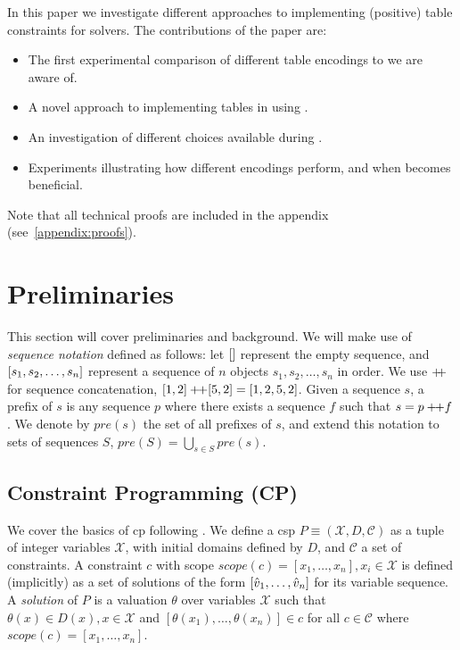 \documentclass[a4paper,UKenglish,cleveref,autoref,thm-restate]{lipics-v2021}
\begin{document}
In this paper we investigate different approaches to implementing (positive) table constraints for \milp solvers. The contributions of the paper are:
\begin{itemize}
    \item The first experimental comparison of different table encodings to \milp we are aware of.
    \item A novel approach to implementing tables in \milp using .
    \item An investigation of different choices available during 
    . 
    \item Experiments illustrating how different encodings perform, and when  becomes beneficial.
\end{itemize}

Note that all technical proofs are included in the appendix (see~\cref{appendix:proofs}).


\section{Preliminaries}
\label{sec:prelim}

This section will cover preliminaries and background.
We will make use of \emph{sequence notation} defined as follows: let $[]$ represent the empty sequence, and $[s_1, s_2, \ldots, s_n]$ represent a sequence of $n$ objects $s_1, s_2, \ldots, s_n$ in order.
We use $+\!\!+$ for sequence concatenation, \eg $[1,2] +\!\!+ [5,2] = [1,2,5,2]$.
Given a sequence $s$, a prefix of $s$ is any sequence $p$ where there exists a sequence $f$ such that $s = p +\!\!+ f$.
We denote by $pre(s)$ the set of all prefixes of $s$, and extend this notation to sets of sequences $S$, $pre(S) = \bigcup_{s \in S} pre(s)$. 

\subsection{Constraint Programming (CP)}

We cover the basics of \gls{cp} following .
We define a \gls{csp} $P \equiv (\mathcal{X},D,\mathcal{C})$ as a tuple of integer variables $\mathcal{X}$, with initial domains defined by $D$, and $\mathcal{C}$ a set of constraints. 
A constraint $c$ with scope $scope(c) = [x_1, \ldots, x_n], x_i \in \mathcal{X}$ is defined (implicitly) as a  set of solutions of the form
$[\hat{v}_1, \ldots, \hat{v}_n]$ for its variable sequence.
A \emph{solution} of $P$ is a valuation $\theta$ over variables $\mathcal{X}$ such that $\theta(x) \in D(x), x \in \mathcal{X}$ and $[\theta(x_1), \ldots, \theta(x_n)] \in c$ for all $c \in \mathcal{C}$ where $scope(c) = [x_1, \ldots, x_n]$. 
\end{document}
